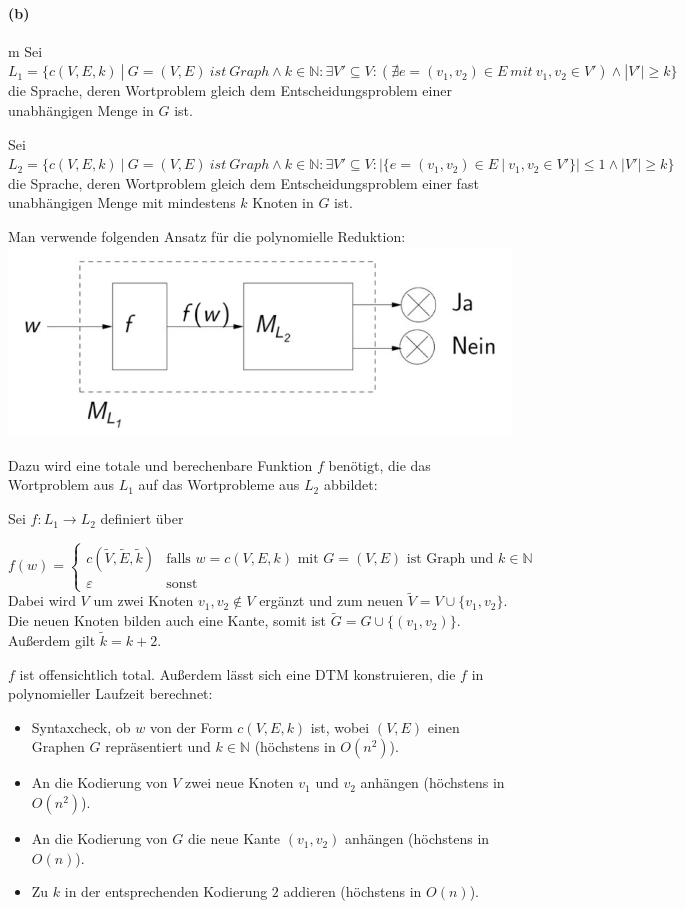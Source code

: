 \paragraph{(b)}m
	Sei	$L_1=\{c(V,E,k)\ |\ G=(V,E)\ ist\ Graph \wedge k\in \mathbb{N}: \exists V' \subseteq V:(\nexists e=(v_1,v_2)\in E\ mit\ v_1,v_2 \in V') \wedge |V'|\geq k \}$\\
	die Sprache, deren Wortproblem gleich dem Entscheidungsproblem einer unabhängigen Menge in $G$ ist.

	Sei	$L_2=\{c(V,E,k)\ |\ G=(V,E)\ ist\ Graph \wedge k\in \mathbb{N}: \exists V' \subseteq V:|\{e=(v_1,v_2)\in E\ |\ v_1,v_2 \in V'\}|\leq 1 \wedge |V'|\geq k \}$\\
	die Sprache, deren Wortproblem gleich dem Entscheidungsproblem einer fast unabhängigen Menge mit mindestens $k$ Knoten in $G$ ist.

	Man verwende folgenden Ansatz für die polynomielle Reduktion:\\
	\includegraphics[scale=0.4]{thinf/sol/f23t2/reduction_idee_skizze}

	Dazu wird eine totale und berechenbare Funktion $f$ benötigt, die das Wortproblem aus $L_1$ auf das Wortprobleme aus $L_2$ abbildet:

	Sei $f:L_1 \rightarrow L_2$ definiert über

	$f(w)=\begin{cases}
		c(\tilde{V},\tilde{E},\tilde{k})&\text{falls $w=c(V,E,k)$ mit $G=(V,E)$ ist Graph und $k \in \mathbb{N}$}\\
		\varepsilon &\text{sonst}
	\end{cases}$\\
	Dabei wird $V$ um zwei Knoten $v_1,v_2 \notin V$ ergänzt und zum neuen $\tilde{V}=V\cup \{v_1,v_2\}$. Die neuen Knoten bilden auch eine Kante, somit ist $\tilde{G}=G\cup \{(v_1,v_2)\}$. Außerdem gilt $\tilde{k}=k+2$.

	$f$ ist offensichtlich total. Außerdem lässt sich eine DTM konstruieren, die $f$ in polynomieller Laufzeit berechnet:
	\begin{itemize}
		\item Syntaxcheck, ob $w$ von der Form $c(V,E,k)$ ist, wobei $(V,E)$ einen Graphen $G$ repräsentiert und $k \in \mathbb{N}$ (höchstens in $O(n^2)$).
		\item An die Kodierung von $V$ zwei neue Knoten $v_1$ und $v_2$ anhängen (höchstens in $O(n^2)$).
		\item An die Kodierung von $G$ die neue Kante $(v_1,v_2)$ anhängen (höchstens in $O(n)$).
		\item Zu $k$ in der entsprechenden Kodierung $2$ addieren (höchstens in $O(n)$).
	\end{itemize}

